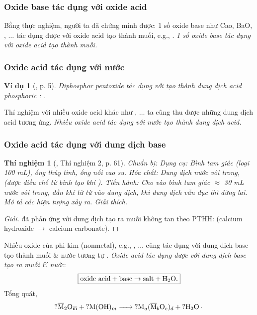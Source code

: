 \documentclass{article}
\newtheorem{thinghiem}{Thí nghiệm}
\newtheorem{vidu}{Ví dụ}
\begin{document}
\subsubsection{Oxide base tác dụng với oxide acid}
Bằng thực nghiệm, người ta đã chứng minh được: 1 số oxide base như Cao, BaO, , $\ldots$ tác dụng được với oxide acid tạo thành muối, e.g., . \textit{1 số oxide base tác dụng với oxide acid tạo thành muối.}

\subsubsection{Oxide acid tác dụng với nước}

\begin{vidu}[\cite{SGK_Hoa_Hoc_9}, p. 5]
	Diphosphor pentoxide \emph{} tác dụng với \emph{} tạo thành dung dịch acid phosphoric \emph{: }.
\end{vidu}
Thí nghiệm với nhiều oxide acid khác như , $\ldots$ ta cũng thu được những dung dịch acid tương ứng. \textit{Nhiều oxide acid tác dụng với nước tạo thành dung dịch acid.}

\subsubsection{Oxide acid tác dụng với dung dịch base}

\begin{thinghiem}[\cite{SGK_KHTN_8_Canh_Dieu}, Thí nghiệm 2, p. 61]
	\emph{Chuẩn bị:} Dụng cụ: Bình tam giác (loại \emph{100 mL}), ống thủy tinh, ống nối cao su. Hóa chất: Dung dịch nước vôi trong, \emph{} (được điều chế từ bình tạo khí \emph{}). \emph{Tiến hành:} Cho vào bình tam giác $\approx$ \emph{30 mL} nước vôi trong, dẫn khí \emph{} từ từ vào dung dịch, khi dung dịch vẫn đục thì dừng lai. Mô tả các hiện tượng xảy ra. Giải thích.
\end{thinghiem}

\begin{proof}[Giải]
	 đã phản ứng với dung dịch  tạo ra muối  không tan theo PTHH:  (calcium hydroxide $\to$ calcium carbonate).
\end{proof}
Nhiều oxide của phi kim (nonmetal), e.g., , $\ldots$ cũng tác dụng với dung dịch base tạo thành muối \& nước tương tự . \textit{Oxide acid tác dụng được với dung dịch base tạo ra muối \& nước}:
\begin{align}
	\label{oxide acid + base}
	\boxed{\mbox{oxide acid} + \mbox{base}\to\mbox{salt} + \ce{H2O}.}
\end{align}
Tổng quát,
\begin{align}
	\ce{$?$\overline{\rm M}2O_{\overline{m}} + $?$M(OH)_m -> $?$M_a(\overline{\rm M}_bO_c)_d + $?$H2O.}
\end{align}
\end{document}
